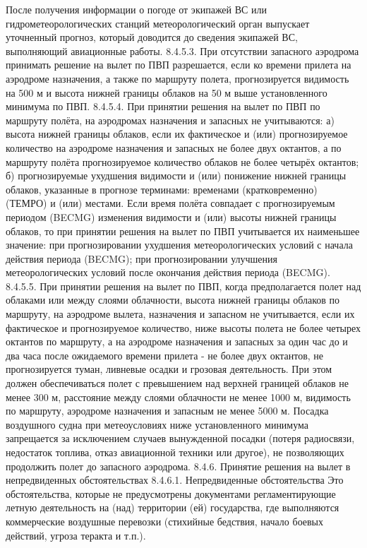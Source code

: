 После получения информации о погоде от экипажей ВС или гидрометеорологических станций метеорологический орган выпускает уточненный прогноз, который доводится до сведения экипажей ВС, выполняющий авиационные работы.
8.4.5.3. При отсутствии запасного аэродрома принимать решение на вылет по ПВП разрешается, если ко времени прилета на аэродроме назначения, а также по маршруту полета, прогнозируется видимость на 500 м и высота нижней границы облаков на 50 м выше установленного минимума по ПВП.
8.4.5.4. При принятии решения на вылет по ПВП по маршруту полёта, на аэродромах назначения и запасных не учитываются:
а)	высота нижней границы облаков, если их фактическое и (или) прогнозируемое количество на аэродроме назначения и запасных не более двух октантов, а по маршруту полёта прогнозируемое количество облаков не более четырёх октантов;
б)	прогнозируемые ухудшения видимости и (или) понижение нижней границы облаков, указанные в прогнозе терминами: временами (кратковременно) (ТЕМРО) и (или) местами.
Если время полёта совпадает с прогнозируемым периодом (BECMG) изменения видимости и (или) высоты нижней границы облаков, то при принятии решения на вылет по ПВП учитывается их наименьшее значение:
при прогнозировании ухудшения метеорологических условий с начала действия периода (BECMG);
при прогнозировании улучшения метеорологических условий после окончания действия периода (BECMG).
8.4.5.5. При принятии решения на вылет по ПВП, когда предполагается полет над облаками или между слоями облачности, высота нижней границы облаков по маршруту, на аэродроме вылета, назначения и запасном не учитывается, если их фактическое и прогнозируемое количество, ниже высоты полета не более четырех октантов по маршруту, а на аэродроме назначения и запасных за один час до и два часа после ожидаемого времени прилета - не более двух октантов, не прогнозируется туман, ливневые осадки и грозовая деятельность. При этом должен обеспечиваться полет с превышением над верхней границей облаков не менее 300 м, расстояние между слоями облачности не менее 1000 м, видимость по маршруту, аэродроме назначения и запасным не менее 5000 м.
Посадка воздушного судна при метеоусловиях ниже установленного минимума запрещается за исключением случаев вынужденной посадки (потеря радиосвязи, недостаток топлива, отказ авиационной техники или другое), не позволяющих продолжить полет до запасного аэродрома.
8.4.6. Принятие решения на вылет в непредвиденных обстоятельствах 
8.4.6.1. Непредвиденные обстоятельства 
Это обстоятельства, которые не предусмотрены документами регламентирующие летную деятельность на (над) территории (ей) государства, где выполняются коммерческие воздушные перевозки (стихийные бедствия, начало боевых действий, угроза теракта и т.п.). 
